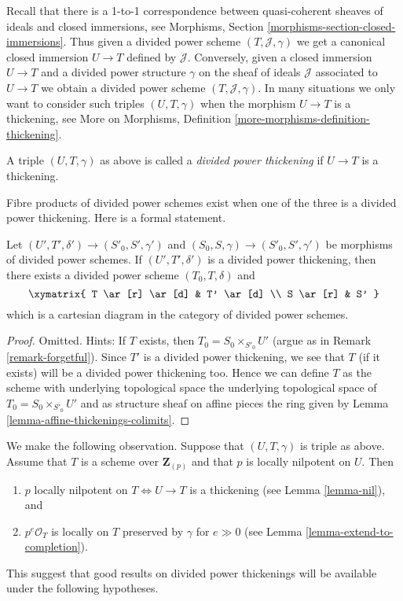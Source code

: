 \noindent
Recall that there is a 1-to-1 correspondence between quasi-coherent
sheaves of ideals and closed immersions, see
Morphisms, Section \ref{morphisms-section-closed-immersions}.
Thus given a divided power scheme $(T, \mathcal{J}, \gamma)$ we
get a canonical closed immersion $U \to T$ defined by $\mathcal{J}$.
Conversely, given a closed immersion $U \to T$ and a divided power
structure $\gamma$ on the sheaf of ideals $\mathcal{J}$ associated
to $U \to T$ we obtain a divided power scheme $(T, \mathcal{J}, \gamma)$.
In many situations we only want to consider such triples
$(U, T, \gamma)$ when the morphism $U \to T$ is a thickening, see
More on Morphisms, Definition \ref{more-morphisms-definition-thickening}.

\begin{definition}
\label{definition-divided-power-thickening}
A triple $(U, T, \gamma)$ as above is called a {\it divided power thickening}
if $U \to T$ is a thickening.
\end{definition}

\noindent
Fibre products of divided power schemes exist when one of the
three is a divided power thickening. Here is a formal statement.

\begin{lemma}
\label{lemma-fibre-product}
Let $(U', T', \delta') \to (S'_0, S', \gamma')$ and
$(S_0, S, \gamma) \to (S'_0, S', \gamma')$ be morphisms of
divided power schemes. If $(U', T', \delta')$ is a divided power
thickening, then there exists a divided power scheme $(T_0, T, \delta)$
and
$$
\xymatrix{
T \ar[r] \ar[d] & T' \ar[d] \\
S \ar[r] & S'
}
$$
which is a cartesian diagram in the category of divided power schemes.
\end{lemma}

\begin{proof}
Omitted. Hints: If $T$ exists, then $T_0 = S_0 \times_{S'_0} U'$
(argue as in Remark \ref{remark-forgetful}).
Since $T'$ is a divided power thickening, we see that $T$
(if it exists) will be a divided power thickening too.
Hence we can define $T$ as the scheme with underlying topological
space the underlying topological space of $T_0 = S_0 \times_{S'_0} U'$
and as structure sheaf on affine pieces the ring given
by Lemma \ref{lemma-affine-thickenings-colimits}.
\end{proof}

\noindent
We make the following observation. Suppose that $(U, T, \gamma)$
is triple as above. Assume that $T$ is a scheme over $\mathbf{Z}_{(p)}$
and that $p$ is locally nilpotent on $U$. Then
\begin{enumerate}
\item $p$ locally nilpotent on $T \Leftrightarrow U \to T$
is a thickening (see Lemma \ref{lemma-nil}), and
\item $p^e\mathcal{O}_T$ is locally on $T$ preserved by $\gamma$
for $e \gg 0$ (see Lemma \ref{lemma-extend-to-completion}).
\end{enumerate}
This suggest that good results on divided power thickenings will be
available under the following hypotheses.

